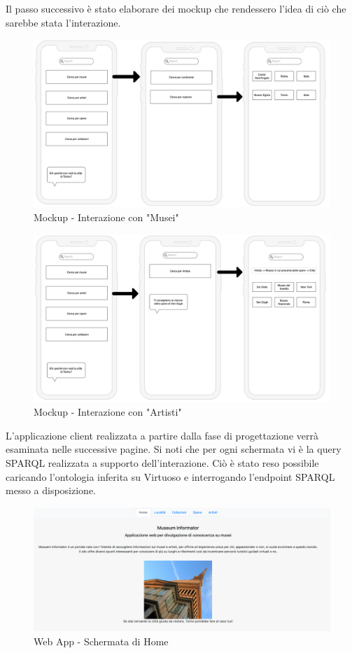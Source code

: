 \documentclass[12pt]{article}
\begin{document}
Il passo successivo è stato elaborare dei mockup che rendessero l'idea di ciò che sarebbe stata l'interazione.
\begin{figure}[!ht]
   \centering
   \includegraphics[scale=0.35]{fig/moqup1.png}
   \caption{Mockup - Interazione con "Musei"}\label{fig:picture}
\end{figure}
\begin{figure}[!ht]
   \centering
   \includegraphics[scale=0.35]{fig/moqup2.png}
   \caption{Mockup - Interazione con "Artisti"}\label{fig:picture}
\end{figure}

L’applicazione client realizzata a partire dalla fase di progettazione verrà esaminata nelle successive pagine. Si noti che per ogni schermata vi è la query SPARQL realizzata a supporto dell’interazione. Ciò è stato reso possibile caricando l'ontologia inferita su Virtuoso e interrogando l'endpoint SPARQL messo a disposizione.

\begin{figure}[!ht]
   \centering
   \includegraphics[scale=0.35]{fig/Schemata 1 webapp.png}
   \caption{Web App - Schermata di Home}\label{fig:picture}
\end{figure}
\end{document}
